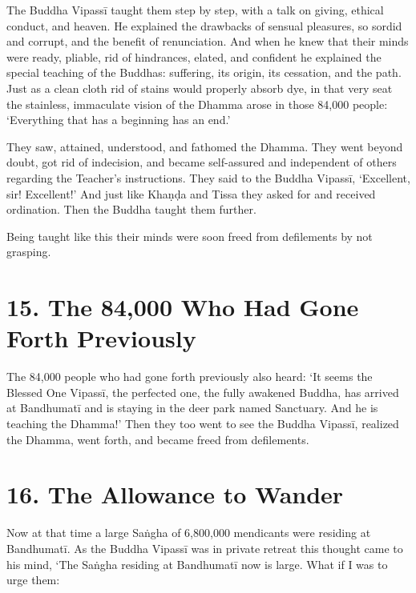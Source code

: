\documentclass[12pt,openany]{book}%
\begin{document}
The Buddha \textsanskrit{Vipassī} taught them step by step, with a talk on giving, ethical conduct, and heaven. He explained the drawbacks of sensual pleasures, so sordid and corrupt, and the benefit of renunciation. And when he knew that their minds were ready, pliable, rid of hindrances, elated, and confident he explained the special teaching of the Buddhas: suffering, its origin, its cessation, and the path. Just as a clean cloth rid of stains would properly absorb dye, in that very seat the stainless, immaculate vision of the Dhamma arose in those 84,000 people: ‘Everything that has a beginning has an end.’ 

They saw, attained, understood, and fathomed the Dhamma. They went beyond doubt, got rid of indecision, and became self-assured and independent of others regarding the Teacher’s instructions. They said to the Buddha \textsanskrit{Vipassī}, ‘Excellent, sir! Excellent!’ And just like \textsanskrit{Khaṇḍa} and Tissa they asked for and received ordination. Then the Buddha taught them further. 

Being taught like this their minds were soon freed from defilements by not grasping. 

\section*{15. The 84,000 Who Had Gone Forth Previously }

The 84,000 people who had gone forth previously also heard: ‘It seems the Blessed One \textsanskrit{Vipassī}, the perfected one, the fully awakened Buddha, has arrived at \textsanskrit{Bandhumatī} and is staying in the deer park named Sanctuary. And he is teaching the Dhamma!’ Then they too went to see the Buddha \textsanskrit{Vipassī}, realized the Dhamma, went forth, and became freed from defilements. 

\section*{16. The Allowance to Wander }

Now at that time a large \textsanskrit{Saṅgha} of 6,800,000 mendicants were residing at \textsanskrit{Bandhumatī}. As the Buddha \textsanskrit{Vipassī} was in private retreat this thought came to his mind, ‘The \textsanskrit{Saṅgha} residing at \textsanskrit{Bandhumatī} now is large. What if I was to urge them: 
\end{document}
